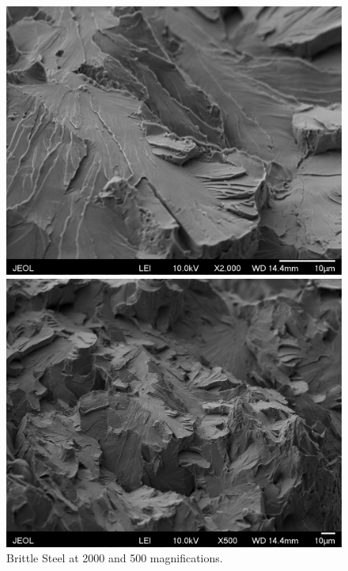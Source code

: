 \documentclass{article}
\begin{document}
\begin{figure}[h]
	\begin{minipage}{0.5\textwidth}
		\centering
		\includegraphics[scale=0.5]{steel_brittle_2kx_e.png}
	\end{minipage}
	\begin{minipage}{0.5\textwidth}
		\centering
		\includegraphics[scale=0.5]{steel_brittle_500x_e.png}
	\end{minipage}
	\caption{Brittle Steel at 2000 and 500 magnifications.}
\end{figure}
\end{document}
